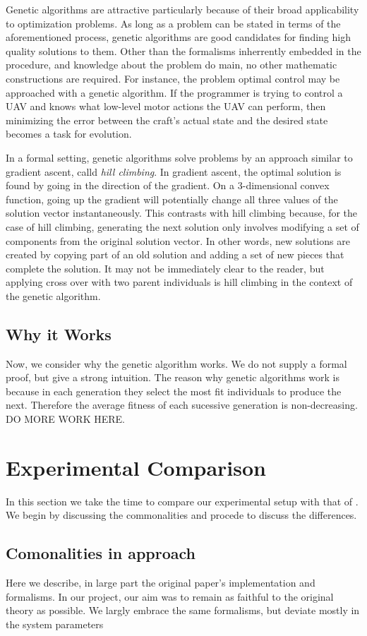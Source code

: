 \documentclass[conference]{IEEEtran}
\begin{document}
Genetic algorithms are attractive particularly because of their broad applicability to optimization problems. As long as a problem can be stated in terms of the aforementioned process, genetic algorithms are good candidates for finding high quality solutions to them. Other than the formalisms inherrently embedded in the procedure, and knowledge about the problem do main, no other mathematic constructions are required. For instance, the problem optimal control may be approached with a genetic algorithm. If the programmer is trying to control a UAV and knows what low-level motor actions the UAV can perform, then minimizing the error between the craft's actual state and the desired state becomes a task for evolution. 

In a formal setting, genetic algorithms solve problems by an approach similar to gradient ascent, calld {\it hill climbing}. In gradient ascent, the optimal solution is found by going in the direction of the gradient. On a 3-dimensional convex function, going up the gradient will potentially change all three values of the solution vector instantaneously. This contrasts with hill climbing because, for the case of hill climbing, generating the next solution only involves modifying a set of components from the original solution vector. In other words, new solutions are created by copying part of an old solution and adding a set of new pieces that complete the solution. It may not be immediately clear to the reader, but applying cross over with two parent individuals is hill climbing in the context of the genetic algorithm.

\subsection{Why it Works}
Now, we consider why the genetic algorithm works. We do not supply a formal proof, but give a strong intuition. The reason why genetic algorithms work is because in each generation they select the most fit individuals to produce the next. Therefore the average fitness of each sucessive generation is non-decreasing. DO MORE WORK HERE.
\section{Experimental Comparison}
In this section we take the time to compare our experimental setup with that of \cite{lillywhite2013feature}. We begin by discussing the commonalities and procede to discuss the differences.
\subsection{Comonalities in approach}
Here we describe, in large part the original paper's implementation and formalisms. In our project, our aim was to remain as faithful to the original theory as possible. We largly embrace the same formalisms, but deviate mostly in the system parameters
\end{document}
